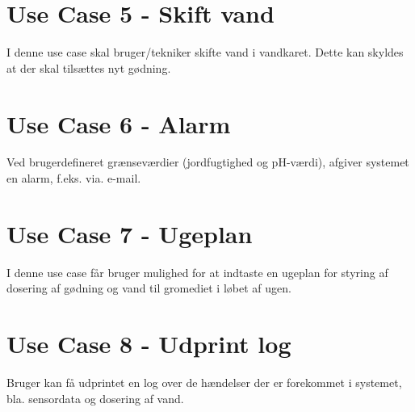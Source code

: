 \section{Use Case 5 - Skift vand}
I denne use case skal bruger/tekniker skifte vand i vandkaret. Dette kan skyldes at der skal tilsættes nyt gødning.

\section{Use Case 6 - Alarm}
Ved brugerdefineret grænseværdier (jordfugtighed og pH-værdi), afgiver systemet en alarm, f.eks. via. e-mail. 

\section{Use Case 7 - Ugeplan}
I denne use case får bruger mulighed for at indtaste en ugeplan for styring af dosering af gødning og vand til gromediet i løbet af ugen. 

\section{Use Case 8 - Udprint log}
Bruger kan få udprintet en log over de hændelser der er forekommet i systemet, bla. sensordata og dosering af vand.
